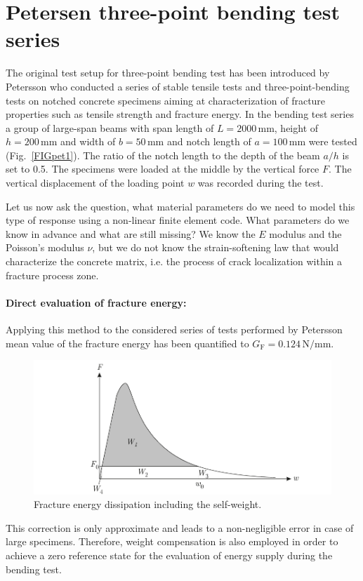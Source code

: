 \documentclass[main.tex]{subfiles}
\begin{document}
\section{Petersen three-point bending test series}

The original test setup for three-point bending test has been introduced by Petersson who conducted a series of stable tensile tests and three-point-bending tests on notched concrete specimens aiming at characterization of fracture properties such as tensile strength and fracture energy. In the bending test series a group of large-span beams with span length of $L=2000\,\mathrm{mm}$, height of $h=200\,\mathrm{mm}$ and width of $b=50\,\mathrm{mm}$ and notch length of $a=100\,\mathrm{mm}$ were tested (Fig.~\ref{FIGpet1}). 
The ratio of the notch length to the depth of the beam $a/h$ is set to 0.5. 
The specimens were loaded at the middle by the vertical force $F$. The vertical displacement of the loading point $w$ was recorded during the test. 

Let us now ask the question, what material parameters do we need to model this type of response using a non-linear finite element code. What parameters do we know in advance and what are still missing? We know the $E$ modulus and the Poisson's modulus $\nu$, but we do not know the strain-softening law that would characterize the concrete matrix, i.e. the process of crack localization within a fracture process zone. 

\paragraph{Direct evaluation of fracture energy:}

Applying this method to the considered series of tests performed by 
Petersson mean value of the fracture energy has been quantified to $G_\mathrm{F} = 0.124\,\mathrm{N/mm}$.  
\begin{figure}
\centering
\includegraphics[width=12cm]{fig/F-w-Gf}
\caption{Fracture energy dissipation including the self-weight.}
\label{FIGf_gravity}
\end{figure}
This correction is only approximate and leads to a non-negligible error in case of large specimens. Therefore, weight compensation is also employed in order to achieve a zero reference state for the evaluation of energy supply during the bending test.
\end{document}
